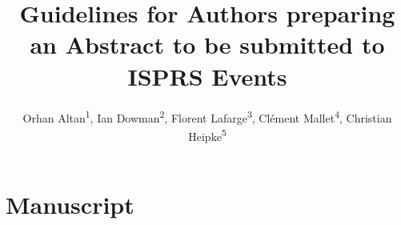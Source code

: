 \documentclass{isprs} %
\begin{document}
\title{Guidelines for Authors preparing an Abstract to be submitted to ISPRS Events
}

\author{
 Orhan Altan\textsuperscript{1}, Ian Dowman\textsuperscript{2}, Florent Lafarge\textsuperscript{3}, Clément Mallet\textsuperscript{4}, Christian Heipke\textsuperscript{5} }

\address{
	\textsuperscript{1 }ITU, Civil Engineering Faculty, 80626 Maslak Istanbul, Turkey - (oaltan, tozg, kulur, seker)@itu.edu.tr\\
	\textsuperscript{2 }Dept.\ of Geomatic Engineering, University College London, Gower Street, London, WC1E 6BT UK - idowman@ge.ucl.ac.uk\\
	\textsuperscript{3 }Université Côte d’Azur, INRIA – Sophia-Antipolis, France – florent.lafarge@inria.fr\\
	\textsuperscript{4 }Univ. Gustave Eiffel, IGN-ENSG, LaSTIG – Saint-Mandé, France – clement.mallet@ign.fr\\
	\textsuperscript{5 }Institute of Photogrammetry and GeoInformation, Leibniz Universit\"at Hannover, Germany - heipke@ipi.uni-hannover.de\\
}




\maketitle

\section{Manuscript}\label{Manuscxript}
\end{document}
